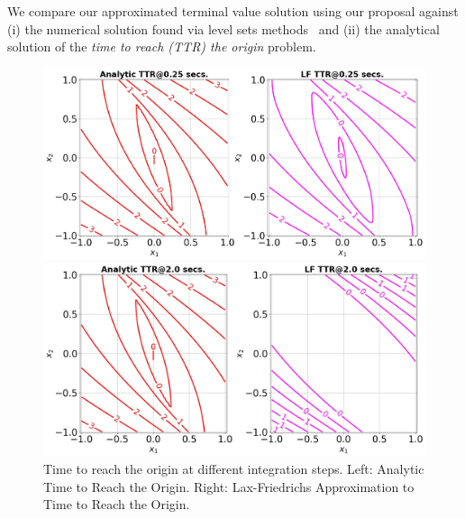 %
%

We compare our approximated terminal value solution using our proposal against (i) the numerical solution found via level sets methods~\cite{LevelSetsBook}  and (ii) the analytical solution of the \textit{time to reach (TTR) the origin} problem.

\begin{figure}[tb!]
	\centering
	\begin{minipage}[b]{.95\textwidth}
		\includegraphics[width=\textwidth]{figures/dint_ttr_0.25.jpg}
	\end{minipage}
	\begin{minipage}[b]{.95\textwidth}
		\includegraphics[width=\textwidth]{figures/dint_ttr_2.0.jpg}
	\end{minipage}
	\caption{\footnotesize Time to reach the origin at different integration steps. Left: Analytic Time to Reach the Origin. Right: Lax-Friedrichs Approximation to Time to Reach the Origin.}
	\label{fig:ttr_ls}
\end{figure}


